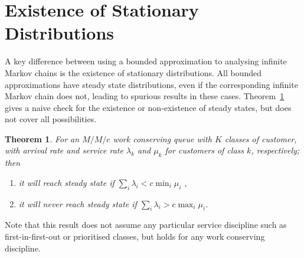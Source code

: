 \documentclass{article}
\newtheorem{theorem}{Theorem}
\begin{document}
\section{Existence of Stationary Distributions}\label{sec:stationary}
A key difference between using a bounded approximation to analysing infinite
Markov chains is the existence of stationary distributions. All bounded
approximations have steady state distributions, even if the corresponding
infinite Markov chain does not, leading to spurious results in these cases.
Theorem~\ref{thrm:steadystate} gives a naive check for the existence or
non-existence of steady states, but does not cover all possibilities.

\begin{theorem}\label{thrm:steadystate}
For an $M/M/c$ work conserving queue with $K$ classes of customer, with arrival
rate and service rate $\lambda_k$ and  $\mu_k$ for customers of class $k$,
respectively; then
\begin{enumerate}
  \item it will reach steady state if $\sum_i \lambda_i < c \min_i \mu_i$ ,
  \item it will never reach steady state if $\sum_i \lambda_i > c \max_i \mu_i$.
\end{enumerate}
\end{theorem}

Note that this result does not assume any particular service discipline such as
first-in-first-out or prioritised classes, but holds for any work conserving
discipline.
\end{document}
